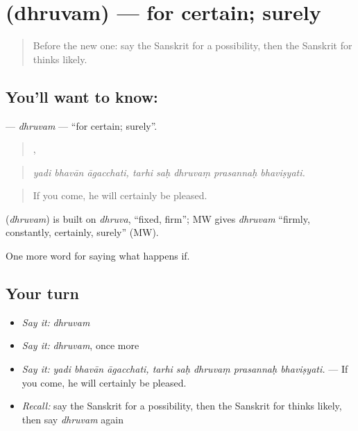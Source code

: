 \section[\texorpdfstring{\sk{ध्रुवम्} (dhruvam)}{ध्रुवम् (dhruvam)}]{ (dhruvam) — for certain; surely}

\label{lesson:SA-C367-dhruvam}



\begin{quote}
Before the new one: say the Sanskrit for a possibility, then the Sanskrit for thinks likely.
\end{quote}

\subsection*{You'll want to know: }
\textbf{} — \emph{dhruvam} — \textquotedblleft{}for certain; surely\textquotedblright{}.

\begin{quote}
  ,     
\end{quote}

\begin{quote}
\emph{yadi bhavān āgacchati, tarhi saḥ dhruvaṃ prasannaḥ bhaviṣyati.}
\end{quote}

\begin{quote}
If you come, he will certainly be pleased.
\end{quote}

\begin{cousinweb}
\textbf{} (\emph{dhruvam}) is built on \emph{dhruva}, \textquotedblleft{}fixed, firm\textquotedblright{}; MW gives \emph{dhruvam} \textquotedblleft{}firmly, constantly, certainly, surely\textquotedblright{} (MW).
\end{cousinweb}

\begin{grammarlens}[title={What you've built}]
One more word for saying what happens if.
\end{grammarlens}

\subsection*{Your turn}
\begin{itemize}
\raggedright
  \item \emph{Say it:} \emph{dhruvam}
  \item \emph{Say it:} \emph{dhruvam}, once more
  \item \emph{Say it:} \emph{yadi bhavān āgacchati, tarhi saḥ dhruvaṃ prasannaḥ bhaviṣyati.} — If you come, he will certainly be pleased.
  \item \emph{Recall:} say the Sanskrit for a possibility, then the Sanskrit for thinks likely, then say \emph{dhruvam} again
\end{itemize}


